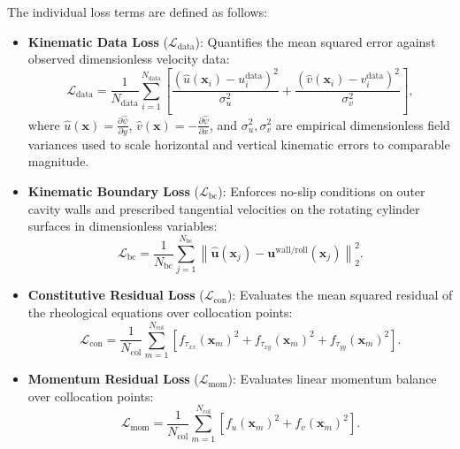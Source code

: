 The individual loss terms are defined as follows:
\begin{itemize}
    \item \textbf{Kinematic Data Loss} ($\mathcal{L}_{\mathrm{data}}$):
        Quantifies the mean squared error against observed dimensionless velocity data:
        \begin{equation}
            \mathcal{L}_{\mathrm{data}} = \frac{1}{N_{\mathrm{data}}} \sum_{i=1}^{N_{\mathrm{data}}} \left[ \frac{(\hat{u}(\boldsymbol{x}_i) - u_i^{\mathrm{data}})^2}{\sigma_u^2} + \frac{(\hat{v}(\boldsymbol{x}_i) - v_i^{\mathrm{data}})^2}{\sigma_v^2} \right] ,
            \label{eq:loss_data_def}
        \end{equation}
        where $\hat{u}(\boldsymbol{x}) = \frac{\partial \hat{\psi}}{\partial y}$,
        $\hat{v}(\boldsymbol{x}) = -\frac{\partial \hat{\psi}}{\partial x}$,
        and $\sigma_u^2, \sigma_v^2$ are empirical dimensionless field variances
        used to scale horizontal and vertical kinematic errors to comparable magnitude.
    \item \textbf{Kinematic Boundary Loss} ($\mathcal{L}_{\mathrm{bc}}$):
        Enforces no-slip conditions on outer cavity walls and prescribed tangential
        velocities on the rotating cylinder surfaces in dimensionless variables:
        \begin{equation}
            \mathcal{L}_{\mathrm{bc}} = \frac{1}{N_{\mathrm{bc}}} \sum_{j=1}^{N_{\mathrm{bc}}} \left\| \hat{\boldsymbol{u}}(\boldsymbol{x}_j) - \boldsymbol{u}^{\mathrm{wall/roll}}(\boldsymbol{x}_j) \right\|_2^2 .
            \label{eq:loss_bc_def}
        \end{equation}
    \item \textbf{Constitutive Residual Loss} ($\mathcal{L}_{\mathrm{con}}$):
        Evaluates the mean squared residual of the rheological equations over
        collocation points:
        \begin{equation}
            \mathcal{L}_{\mathrm{con}} = \frac{1}{N_{\mathrm{col}}} \sum_{m=1}^{N_{\mathrm{col}}} \left[ f_{\tau_{xx}}(\boldsymbol{x}_m)^2 + f_{\tau_{xy}}(\boldsymbol{x}_m)^2 + f_{\tau_{yy}}(\boldsymbol{x}_m)^2 \right] .
            \label{eq:loss_con_def}
        \end{equation}
    \item \textbf{Momentum Residual Loss} ($\mathcal{L}_{\mathrm{mom}}$):
        Evaluates linear momentum balance over collocation points:
        \begin{equation}
            \mathcal{L}_{\mathrm{mom}} = \frac{1}{N_{\mathrm{col}}} \sum_{m=1}^{N_{\mathrm{col}}} \left[ f_u(\boldsymbol{x}_m)^2 + f_v(\boldsymbol{x}_m)^2 \right] .

\end{equation}
\end{itemize}
